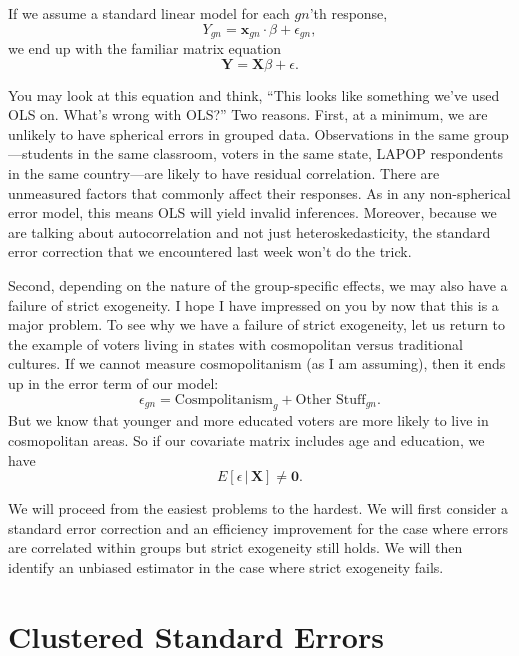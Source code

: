 \documentclass[
  12pt,
  oneside,openany]{book}
\begin{document}
If we assume a standard linear model for each \(gn\)'th response,
\[
Y_{gn} = \mathbf{x}_{gn} \cdot \beta + \epsilon_{gn},
\]
we end up with the familiar matrix equation
\[
\mathbf{Y} = \mathbf{X} \beta + \epsilon.
\]

You may look at this equation and think, ``This looks like something we've used OLS on. What's wrong with OLS?'' Two reasons. First, at a minimum, we are unlikely to have spherical errors in grouped data. Observations in the same group---students in the same classroom, voters in the same state, LAPOP respondents in the same country---are likely to have residual correlation. There are unmeasured factors that commonly affect their responses. As in any non-spherical error model, this means OLS will yield invalid inferences. Moreover, because we are talking about autocorrelation and not just heteroskedasticity, the standard error correction that we encountered last week won't do the trick.

Second, depending on the nature of the group-specific effects, we may also have a failure of strict exogeneity. I hope I have impressed on you by now that this is a major problem. To see why we have a failure of strict exogeneity, let us return to the example of voters living in states with cosmopolitan versus traditional cultures. If we cannot measure cosmopolitanism (as I am assuming), then it ends up in the error term of our model:
\[
\epsilon_{gn} = \text{Cosmpolitanism}_g + \text{Other Stuff}_{gn}.
\]
But we know that younger and more educated voters are more likely to live in cosmopolitan areas. So if our covariate matrix includes age and education, we have
\[
E[\epsilon \,|\, \mathbf{X}] \neq \mathbf{0}.
\]

We will proceed from the easiest problems to the hardest. We will first consider a standard error correction and an efficiency improvement for the case where errors are correlated within groups but strict exogeneity still holds. We will then identify an unbiased estimator in the case where strict exogeneity fails.

\hypertarget{clustered-standard-errors}{%
\section{Clustered Standard Errors}\label{clustered-standard-errors}}
\end{document}

